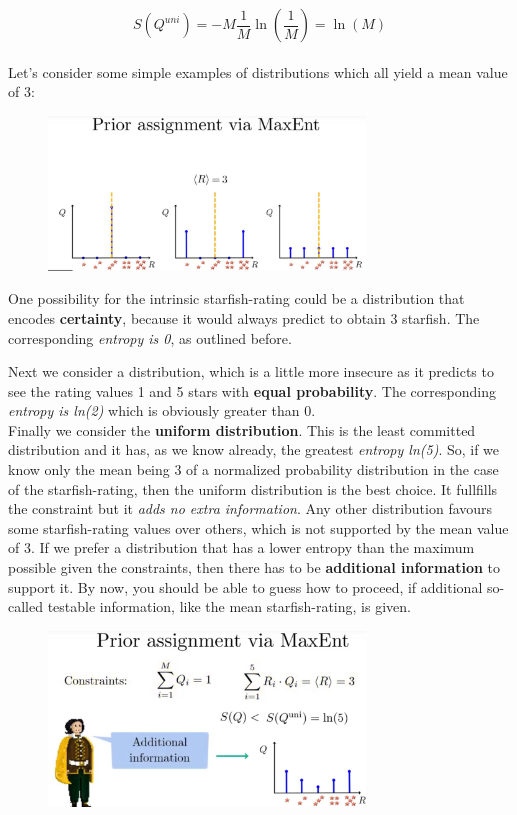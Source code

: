 \documentclass[12pt, a4paper]{scrartcl}
\begin{document}
\begin{equation*}\boxed{S(Q^{uni})=-M\frac 1M \ln\left(\frac 1M\right)=\ln(M)
}\end{equation*}\\

Let’s consider some simple examples of distributions which all yield a
mean value of 3:\\ %
 \begin{figure}[H]
	\centering
	\includegraphics[width=0.75\textwidth]{6_4.png}
\end{figure}

One possibility for the intrinsic starﬁsh-rating could be a distribution
that encodes \textbf{certainty}, because it would always predict to obtain 3 starﬁsh.
The corresponding \textit{entropy is 0}, as outlined before.

Next we consider a distribution, which is a little more insecure as it predicts to see the rating values 1 and 5 stars
with \textbf{equal probability}. The corresponding \textit{entropy is ln(2)} which is
obviously greater than 0.\\

Finally we consider the \textbf{uniform distribution}. This is the least committed distribution and it has, as we know already, the greatest \textit{entropy ln(5)}.
So, if we know only the mean being 3 of a normalized probability distribution
in the case of the starﬁsh-rating, then the uniform distribution is the best
choice. It fullﬁlls the constraint but it \textit{adds no extra information}.
Any other distribution favours some starﬁsh-rating values over others, which
is not supported by the mean value of 3.
If we prefer a distribution that has a lower entropy than the maximum possible 
given the constraints, then there has to be \textbf{additional information} to support it.
By now, you should be able to guess how to proceed, if additional so-called
testable information, like the mean starﬁsh-rating, is given.\\%
 \begin{figure}[H]
	\centering
	\includegraphics[width=0.75\textwidth]{6_5.png}
\end{figure}
\end{document}
